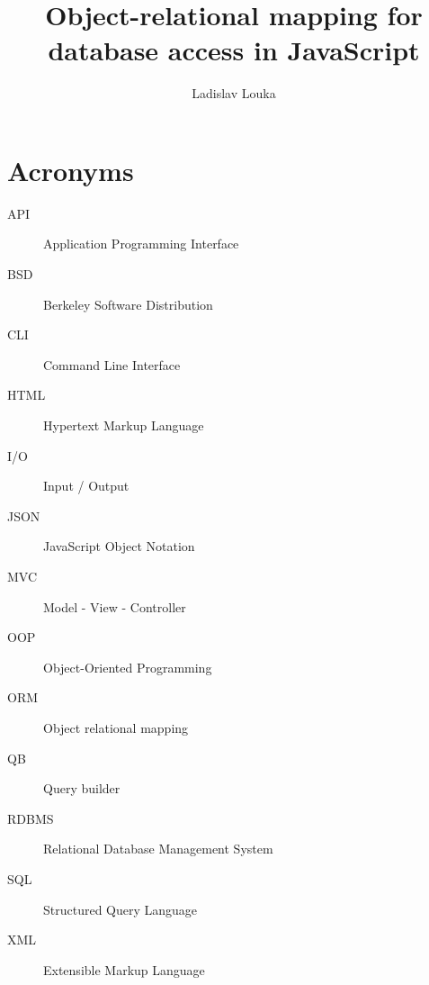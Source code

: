 \documentclass[thesis=M,english]{FITthesis}[2019/12/23]
\title{Object-relational mapping for database access in JavaScript}
\author{Ladislav Louka} %
\begin{document}


\chapter{Acronyms}
\begin{description}
	\item[API] Application Programming Interface
	\item[BSD] Berkeley Software Distribution
	\item[CLI] Command Line Interface
	\item[HTML] Hypertext Markup Language
	\item[I/O] Input / Output
	\item[JSON] JavaScript Object Notation 
	\item[MVC] Model - View - Controller
	\item[OOP] Object-Oriented Programming 
	\item[ORM] Object relational mapping
	\item[QB] Query builder
	\item[RDBMS] Relational Database Management System
	\item[SQL] Structured Query Language	
	\item[XML] Extensible Markup Language
\end{description}















% 
% 

\appendix

{
	\setlength{\emergencystretch}{1em}
	\printbibliography
}
\end{document}
